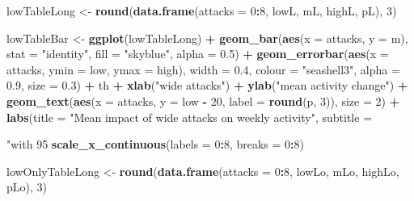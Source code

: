 \documentclass[10pt,]{scrartcl}
\newenvironment{Shaded}{\begin{snugshade}}{\end{snugshade}}
\newcommand{\KeywordTok}[1]{\textcolor[rgb]{0.13,0.29,0.53}{\textbf{#1}}}
\newcommand{\DataTypeTok}[1]{\textcolor[rgb]{0.13,0.29,0.53}{#1}}
\newcommand{\DecValTok}[1]{\textcolor[rgb]{0.00,0.00,0.81}{#1}}
\newcommand{\FloatTok}[1]{\textcolor[rgb]{0.00,0.00,0.81}{#1}}
\newcommand{\StringTok}[1]{\textcolor[rgb]{0.31,0.60,0.02}{#1}}
\newcommand{\OperatorTok}[1]{\textcolor[rgb]{0.81,0.36,0.00}{\textbf{#1}}}
\newcommand{\NormalTok}[1]{#1}
\begin{document}
\begin{Shaded}
\begin{Highlighting}[]
\NormalTok{lowTableLong <-}\StringTok{ }\KeywordTok{round}\NormalTok{(}\KeywordTok{data.frame}\NormalTok{(}\DataTypeTok{attacks =} \DecValTok{0}\OperatorTok{:}\DecValTok{8}\NormalTok{, lowL, mL, highL,}
\NormalTok{    pL), }\DecValTok{3}\NormalTok{)}

\NormalTok{lowTableBar <-}\StringTok{ }\KeywordTok{ggplot}\NormalTok{(lowTableLong) }\OperatorTok{+}\StringTok{ }\KeywordTok{geom_bar}\NormalTok{(}\KeywordTok{aes}\NormalTok{(}\DataTypeTok{x =}\NormalTok{ attacks,}
    \DataTypeTok{y =}\NormalTok{ m), }\DataTypeTok{stat =} \StringTok{"identity"}\NormalTok{, }\DataTypeTok{fill =} \StringTok{"skyblue"}\NormalTok{, }\DataTypeTok{alpha =} \FloatTok{0.5}\NormalTok{) }\OperatorTok{+}
\StringTok{    }\KeywordTok{geom_errorbar}\NormalTok{(}\KeywordTok{aes}\NormalTok{(}\DataTypeTok{x =}\NormalTok{ attacks, }\DataTypeTok{ymin =}\NormalTok{ low, }\DataTypeTok{ymax =}\NormalTok{ high),}
        \DataTypeTok{width =} \FloatTok{0.4}\NormalTok{, }\DataTypeTok{colour =} \StringTok{"seashell3"}\NormalTok{, }\DataTypeTok{alpha =} \FloatTok{0.9}\NormalTok{, }\DataTypeTok{size =} \FloatTok{0.3}\NormalTok{) }\OperatorTok{+}
\StringTok{    }\NormalTok{th }\OperatorTok{+}\StringTok{ }\KeywordTok{xlab}\NormalTok{(}\StringTok{"wide attacks"}\NormalTok{) }\OperatorTok{+}\StringTok{ }\KeywordTok{ylab}\NormalTok{(}\StringTok{"mean activity change"}\NormalTok{) }\OperatorTok{+}
\StringTok{    }\KeywordTok{geom_text}\NormalTok{(}\KeywordTok{aes}\NormalTok{(}\DataTypeTok{x =}\NormalTok{ attacks, }\DataTypeTok{y =}\NormalTok{ low }\OperatorTok{-}\StringTok{ }\DecValTok{20}\NormalTok{, }\DataTypeTok{label =} \KeywordTok{round}\NormalTok{(p,}
        \DecValTok{3}\NormalTok{)), }\DataTypeTok{size =} \DecValTok{2}\NormalTok{) }\OperatorTok{+}\StringTok{ }\KeywordTok{labs}\NormalTok{(}\DataTypeTok{title =} \StringTok{"Mean impact of wide attacks on  weekly activity"}\NormalTok{,}
    \DataTypeTok{subtitle =} \StringTok{"with 95%
\StringTok{    }\KeywordTok{scale_x_continuous}\NormalTok{(}\DataTypeTok{labels =} \DecValTok{0}\OperatorTok{:}\DecValTok{8}\NormalTok{, }\DataTypeTok{breaks =} \DecValTok{0}\OperatorTok{:}\DecValTok{8}\NormalTok{)}


\NormalTok{lowOnlyTableLong <-}\StringTok{ }\KeywordTok{round}\NormalTok{(}\KeywordTok{data.frame}\NormalTok{(}\DataTypeTok{attacks =} \DecValTok{0}\OperatorTok{:}\DecValTok{8}\NormalTok{, lowLo, mLo,}
\NormalTok{    highLo, pLo), }\DecValTok{3}\NormalTok{)}

}
\end{Highlighting}
\end{Shaded}
\end{document}
